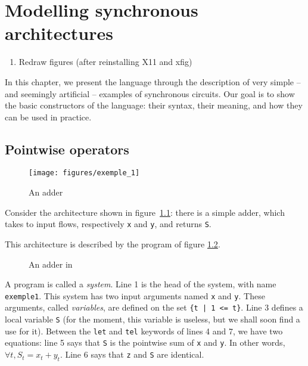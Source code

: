 \chapter{Modelling synchronous architectures}
\label{chapalphascal}

\begin{tobedone}
\begin{enumerate}
\item Redraw figures (after reinstalling X11 and xfig)
\end{enumerate}
\end{tobedone}

In this chapter, we present the {\alfa} language through the 
description of very simple -- and seemingly artificial -- examples
of synchronous circuits. Our goal is to show the basic constructors
of the language: their syntax, their meaning, and how they can be
used in practice. 
% 
\section{Pointwise operators}
\begin{figure}[htbp]
\centerline{\texttt{[image: figures/exemple\_1]}}
\caption{An adder\label{adder1}}
\end{figure}
Consider the architecture shown in figure~\ref{adder1}: there is a 
simple adder, 
which takes to input flows, respectively {\tt x} and 
{\tt y}, and returns {\tt S}. 

This architecture is described by the {\alfa} program of figure \ref{adder-alpha}.
\begin{figure}[htbp]

\caption{An adder in {\alfa}}\label{adder-alpha}
\end{figure}
A program is called a {\em system}. 
Line 1 is the head of the system, 
with name {\tt exemple1}. This system has two input arguments
named
{\tt x} and {\tt y}. These arguments, called {\em variables}, are
defined on the set {\tt \{t | 1 <= t\}}. Line 3 defines a local variable
{\tt S} (for the moment, this variable is useless, but we shall
soon find a use for it). 
Between the {\tt let} and {\tt tel} keywords of lines 4 and
7, we have two equations: 
line 5 says that {\tt S} is the pointwise sum of 
{\tt x} and {\tt y}. In other words, $\forall t, S_t = x_t + y_t$. 
Line 6 says that {\tt z} and {\tt S} are identical.
